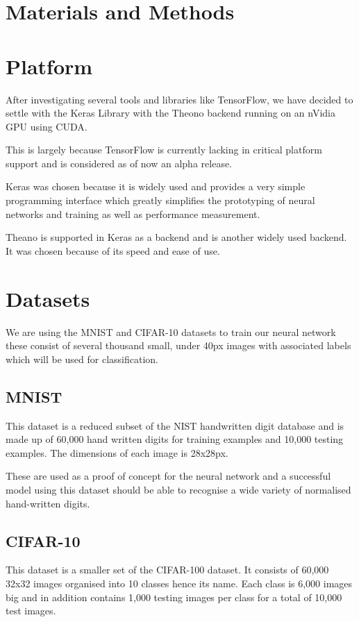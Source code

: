 \documentclass[a0,portrait]{a0poster}
\begin{document}
\begin{multicols}{2}

\section*{Materials and Methods}

\section{Platform}
After investigating several tools and libraries like TensorFlow, we have decided to settle with the Keras Library with the Theono backend running on an nVidia GPU using CUDA.

This is largely because TensorFlow is currently lacking in critical platform support and is considered as of now an alpha release.

Keras was chosen because it is widely used and provides a very simple programming interface which greatly simplifies the prototyping of neural networks and training as well as performance measurement.

Theano is supported in Keras as a backend and is another widely used backend. It was chosen because of its speed and ease of use.

\section{Datasets}
We are using the MNIST and CIFAR-10 datasets to train our neural network these consist of several thousand small, under 40px images with associated labels which will be used for classification.

\subsection{MNIST}
This dataset is a reduced subset of the NIST handwritten digit database and is made up of 60,000 hand written digits for training examples and 10,000 testing examples. The dimensions of each image is 28x28px.

These are used as a proof of concept for the neural network and a successful model using this dataset should be able to recognise a wide variety of normalised hand-written digits.

\subsection{CIFAR-10}
This dataset is a smaller set of the CIFAR-100 dataset. It consists of 60,000 32x32 images organised into 10 classes hence its name. Each class is 6,000 images big and in addition contains 1,000 testing images per class for a total of 10,000 test images.


\end{multicols}
\end{document}

